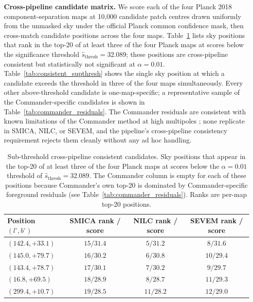 \documentclass[11pt,a4paper]{article}
\begin{document}
\textbf{Cross-pipeline candidate matrix.} We score each of the four Planck 2018 component-separation maps at 10{,}000 candidate patch centres drawn uniformly from the unmasked sky under the official Planck common confidence mask, then cross-match candidate positions across the four maps. Table~\ref{tab:consistent_subthresh} lists sky positions that rank in the top-20 of at least three of the four Planck maps at scores below the significance threshold $\hat{s}_{\text{thresh}} = 32.089$; these positions are cross-pipeline consistent but statistically not significant at $\alpha = 0.01$. Table~\ref{tab:consistent_supthresh} shows the single sky position at which a candidate exceeds the threshold in three of the four maps simultaneously. Every other above-threshold candidate is one-map-specific; a representative sample of the Commander-specific candidates is shown in Table~\ref{tab:commander_residuals}. The Commander residuals are consistent with known limitations of the Commander method at high multipoles \citep{planck2018_iv}; none replicate in SMICA, NILC, or SEVEM, and the pipeline's cross-pipeline consistency requirement rejects them cleanly without any ad hoc handling.

\begin{table}[t]
\centering
\caption{Sub-threshold cross-pipeline consistent candidates. Sky positions that appear in the top-20 of at least three of the four Planck maps at scores below the $\alpha = 0.01$ threshold of $\hat{s}_{\text{thresh}} = 32.089$. The Commander column is empty for each of these positions because Commander's own top-20 is dominated by Commander-specific foreground residuals (see Table~\ref{tab:commander_residuals}). Ranks are per-map top-20 positions.}
\label{tab:consistent_subthresh}
\begin{tabular}{lccc}
\toprule
Position $(l^\circ, b^\circ)$ & SMICA rank / score & NILC rank / score & SEVEM rank / score \\
\midrule
$(142.4, +33.1)$ & $15 / 31.4$ & $5 / 31.2$ & $8 / 31.6$ \\
$(145.0, +79.7)$ & $16 / 30.2$ & $6 / 30.8$ & $10 / 29.4$ \\
$(143.4, +78.7)$ & $17 / 30.1$ & $7 / 30.2$ & $9 / 29.7$ \\
$(16.8, +69.5)$  & $18 / 28.9$ & $8 / 28.7$ & $11 / 29.3$ \\
$(299.4, +10.7)$ & $19 / 28.5$ & $11 / 28.2$ & $12 / 29.0$ \\
\bottomrule
\end{tabular}
\end{table}
\end{document}
